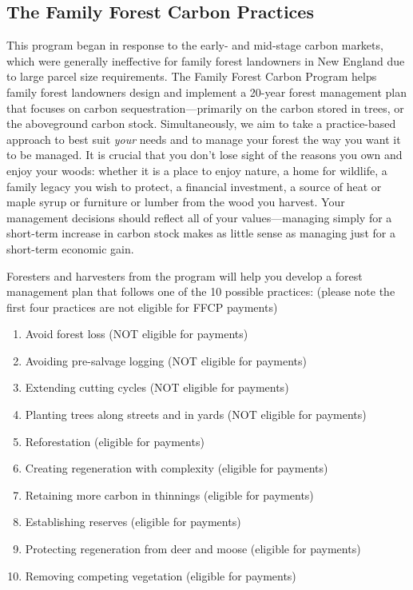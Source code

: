 \documentclass{article}\usepackage[]{graphicx}\usepackage[]{color}
\begin{document}
\subsection*{The Family Forest Carbon Practices}
This program began in response to the early- and mid-stage carbon markets, which were generally ineffective for family forest landowners in New England due to large parcel size requirements. The Family Forest Carbon Program helps family forest landowners design and implement a 20-year forest management plan that focuses on carbon sequestration---primarily on the carbon stored in trees, or the aboveground carbon stock. Simultaneously, we aim to take a practice-based approach to best suit \textit{your} needs and to manage your forest the way you want it to be managed. It is crucial that you don't lose sight of the reasons you own and enjoy your woods: whether it is a place to enjoy nature, a home for wildlife, a family legacy you wish to protect, a financial investment, a source of heat or maple syrup or furniture or lumber from the wood you harvest. Your management decisions should reflect all of your values---managing simply for a short-term increase in carbon stock makes as little sense as managing just for a short-term economic gain.

Foresters and harvesters from the program will help you develop a forest management plan that follows one of the 10 possible practices: (please note the first four practices are not eligible for FFCP payments)

\begin{enumerate}
\item Avoid forest loss (NOT eligible for payments)
\item Avoiding pre-salvage logging (NOT eligible for payments)
\item Extending cutting cycles (NOT eligible for payments)
\item Planting trees along streets and in yards (NOT eligible for payments)
\item Reforestation (eligible for payments)
\item Creating regeneration with complexity (eligible for payments)
\item Retaining more carbon in thinnings (eligible for payments)
\item Establishing reserves (eligible for payments)
\item Protecting regeneration from deer and moose (eligible for payments)
\item Removing competing vegetation (eligible for payments)
\end{enumerate}
\end{document}
